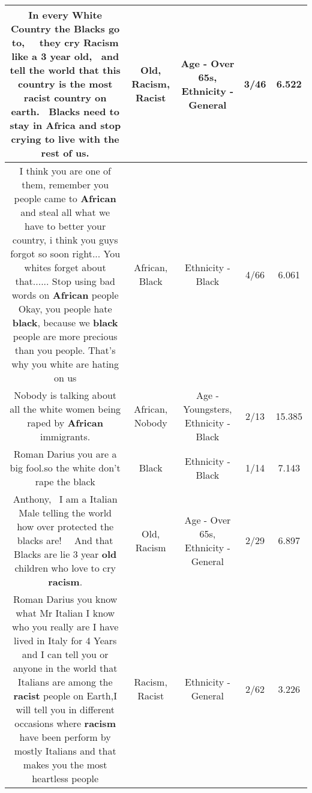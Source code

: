 \documentclass[11pt]{article}
\newlength\mylength
\begin{document}
\begin{center}
\begin{longtable}{|C{.65\mylength}|C{.30\mylength}|C{.12\mylength}|C{.12\mylength}|C{.12\mylength}|}
  \small In every White Country the Blacks go to,   they cry \textbf{Racism} like a 3 year \textbf{old},  and tell the world that this country is the most \textbf{racist} country on earth.  Blacks need to stay in Africa and stop crying to live with the rest of us.\normalsize   & Old, Racism, Racist & Age - Over 65s, Ethnicity - General & 3/46 & 6.522 \\  \hline
  \small I think you are one of them, remember you people came to \textbf{African} and steal all what we have to better your country, i think you guys forgot so soon right... You whites forget about that...... Stop using bad words on \textbf{African} people Okay, you people hate \textbf{black}, because we \textbf{black} people are more precious than you people. That's why you white are hating on us\normalsize   & African, Black & Ethnicity - Black & 4/66 & 6.061 \\  \hline
  \small Nobody is talking about all the white women being raped by \textbf{African} immigrants.\normalsize   & African, Nobody & Age - Youngsters, Ethnicity - Black & 2/13 & 15.385 \\  \hline
  \small Roman Darius you are a big fool.so the white don't rape the black\normalsize   & Black & Ethnicity - Black & 1/14 & 7.143 \\  \hline
  \small Anthony,  I am a Italian Male telling the world how over protected the blacks are!   And that Blacks are lie 3 year \textbf{old} children who love to cry \textbf{racism}.\normalsize   & Old, Racism & Age - Over 65s, Ethnicity - General & 2/29 & 6.897 \\  \hline
  \small Roman Darius you know what Mr Italian  I know who you really are I have lived in Italy for 4 Years and I can tell you or anyone in the world that Italians are among the \textbf{racist} people on Earth,I will tell you in different occasions where \textbf{racism} have been perform by mostly Italians and that makes you the  most heartless people\normalsize   & Racism, Racist & Ethnicity - General & 2/62 & 3.226 \\  \hline

\end{longtable}
\end{center}
\end{document}

